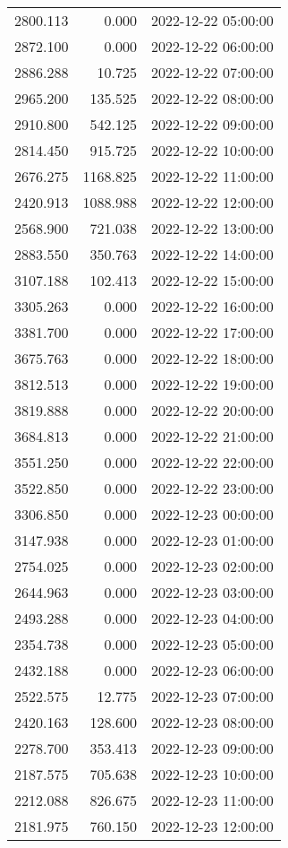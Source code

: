 \documentclass[
]{article}
\begin{document}
\begin{longtable}[]{@{}rrl@{}}
2800.113 & 0.000 & 2022-12-22 05:00:00 \\
2872.100 & 0.000 & 2022-12-22 06:00:00 \\
2886.288 & 10.725 & 2022-12-22 07:00:00 \\
2965.200 & 135.525 & 2022-12-22 08:00:00 \\
2910.800 & 542.125 & 2022-12-22 09:00:00 \\
2814.450 & 915.725 & 2022-12-22 10:00:00 \\
2676.275 & 1168.825 & 2022-12-22 11:00:00 \\
2420.913 & 1088.988 & 2022-12-22 12:00:00 \\
2568.900 & 721.038 & 2022-12-22 13:00:00 \\
2883.550 & 350.763 & 2022-12-22 14:00:00 \\
3107.188 & 102.413 & 2022-12-22 15:00:00 \\
3305.263 & 0.000 & 2022-12-22 16:00:00 \\
3381.700 & 0.000 & 2022-12-22 17:00:00 \\
3675.763 & 0.000 & 2022-12-22 18:00:00 \\
3812.513 & 0.000 & 2022-12-22 19:00:00 \\
3819.888 & 0.000 & 2022-12-22 20:00:00 \\
3684.813 & 0.000 & 2022-12-22 21:00:00 \\
3551.250 & 0.000 & 2022-12-22 22:00:00 \\
3522.850 & 0.000 & 2022-12-22 23:00:00 \\
3306.850 & 0.000 & 2022-12-23 00:00:00 \\
3147.938 & 0.000 & 2022-12-23 01:00:00 \\
2754.025 & 0.000 & 2022-12-23 02:00:00 \\
2644.963 & 0.000 & 2022-12-23 03:00:00 \\
2493.288 & 0.000 & 2022-12-23 04:00:00 \\
2354.738 & 0.000 & 2022-12-23 05:00:00 \\
2432.188 & 0.000 & 2022-12-23 06:00:00 \\
2522.575 & 12.775 & 2022-12-23 07:00:00 \\
2420.163 & 128.600 & 2022-12-23 08:00:00 \\
2278.700 & 353.413 & 2022-12-23 09:00:00 \\
2187.575 & 705.638 & 2022-12-23 10:00:00 \\
2212.088 & 826.675 & 2022-12-23 11:00:00 \\
2181.975 & 760.150 & 2022-12-23 12:00:00 \\

\end{longtable}
\end{document}
